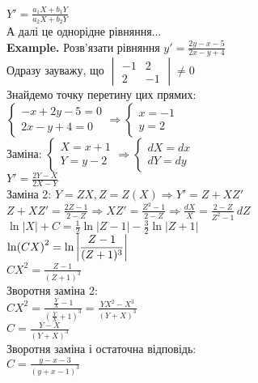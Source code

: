 \documentclass[a4paper, 14pt]{extarticle}
\def\huge{\displaystyle}
\def\bigline{\vspace{5mm}\\}
\begin{document}
	$\huge Y' = \frac{a_1 X + b_1 Y}{a_2 X + b_2 Y}$\\
	А далі це однорідне рівняння...
	\bigline
	\textbf{Example.} Розв'язати рівняння $\huge y' = \frac{2y-x-5}{2x-y+4}$\\
	Одразу зауважу, що $\begin{vmatrix} -1 & 2 \\ 2 & -1 \end{vmatrix} \neq 0$\\
	Знайдемо точку перетину цих прямих:\\
	$\begin{cases}
	- x + 2y - 5 = 0\\
	2 x - y + 4= 0
	\end{cases} \Rightarrow
	\begin{cases}
	x = -1\\
	y = 2
	\end{cases} 
	$\\
	Заміна:
	$\begin{cases}
	X = x + 1\\
	Y = y -2
	\end{cases} \Rightarrow
	\begin{cases}
	dX = dx\\
	dY = dy
	\end{cases}
	$\\
	$\huge Y' = \frac{2Y-X}{2X-Y}$\\
	Заміна 2: $Y=ZX, Z=Z(X) \Rightarrow Y' = Z + XZ'$\\
	$\huge Z + XZ' = \frac{2Z-1}{2-Z} \Rightarrow XZ' = \frac{Z^2-1}{2-Z} \Rightarrow \frac{dX}{X} = \frac{2-Z}{Z^2-1}\,dZ$\\
	$\huge \ln|X| + C= \frac{1}{2} \ln |Z-1| - \frac{3}{2} \ln |Z+1|$\\
	$\huge \ln(CX)^2 = \ln \abs{\frac{Z-1}{(Z+1)^3}}$\\
	$\huge CX^2 = \frac{Z-1}{(Z+1)^3}$\\
	Зворотня заміна 2:\\
	$\huge CX^2 = \frac{\frac{Y}{X}-1}{(\frac{Y}{X}+1)^3} = \frac{YX^2-X^3}{(Y+X)^3}$\\
	$\huge C = \frac{Y-X}{(Y+X)^3}$\\
	Зворотня заміна і остаточна відповідь:\\
	$\huge C = \frac{y-x-3}{(y+x-1)^3}$\\
	
\end{document}
